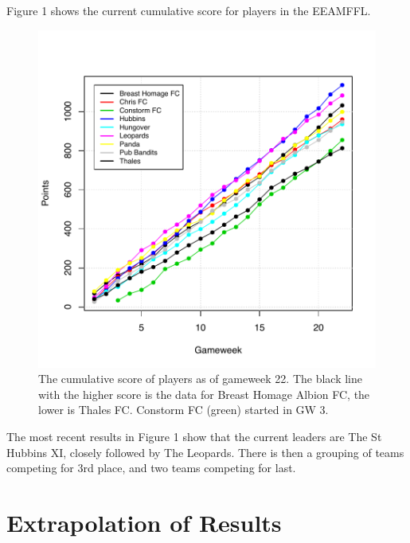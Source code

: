 \documentclass[aps,prl,twocolumn,showpacs,superscriptaddress,groupedaddress]{revtex4}  %
\begin{document}
Figure 1 shows the current cumulative score for players in the EEAMFFL.
\begin{figure}
\includegraphics[width=\linewidth]{cumgraph2.pdf}
\caption{The cumulative score of players as of gameweek 22. The black line with the higher score is the data for Breast Homage Albion FC, the lower is Thales FC. Constorm FC (green) started in GW 3.}
\end{figure}
The most recent results in Figure 1 show that the current leaders are The St Hubbins XI, closely followed by The Leopards. There is then a grouping of teams competing for 3rd place, and two teams competing for last.

\section{Extrapolation of Results}
\end{document}
